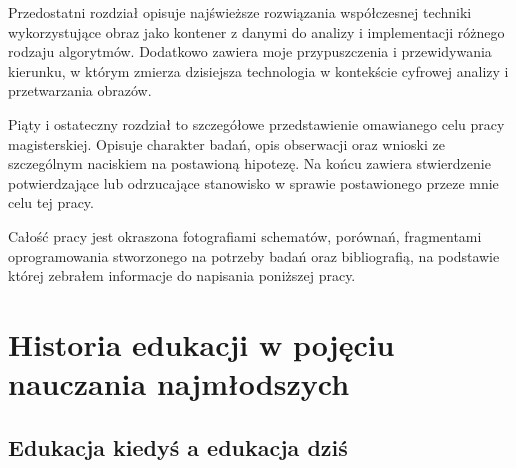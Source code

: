 \documentclass{article}
\begin{document}
	\par
	Przedostatni rozdział opisuje najświeższe rozwiązania współczesnej techniki wykorzystujące obraz jako kontener z danymi do analizy i implementacji różnego rodzaju algorytmów. Dodatkowo zawiera moje przypuszczenia i przewidywania kierunku, w którym zmierza dzisiejsza technologia w kontekście cyfrowej analizy i przetwarzania obrazów.
	\par
	Piąty i ostateczny rozdział to szczegółowe przedstawienie omawianego celu pracy magisterskiej. Opisuje charakter badań, opis obserwacji oraz wnioski ze szczególnym naciskiem na postawioną hipotezę. Na końcu zawiera stwierdzenie potwierdzające lub odrzucające stanowisko w sprawie postawionego przeze mnie celu tej pracy.
	\par
	Całość pracy jest okraszona fotografiami schematów, porównań, fragmentami oprogramowania stworzonego na potrzeby badań oraz bibliografią, na podstawie której zebrałem informacje do napisania poniższej pracy.
	
	\section{Historia edukacji w pojęciu nauczania najmłodszych}
	\subsection{Edukacja kiedyś a edukacja dziś}
	
\end{document}
